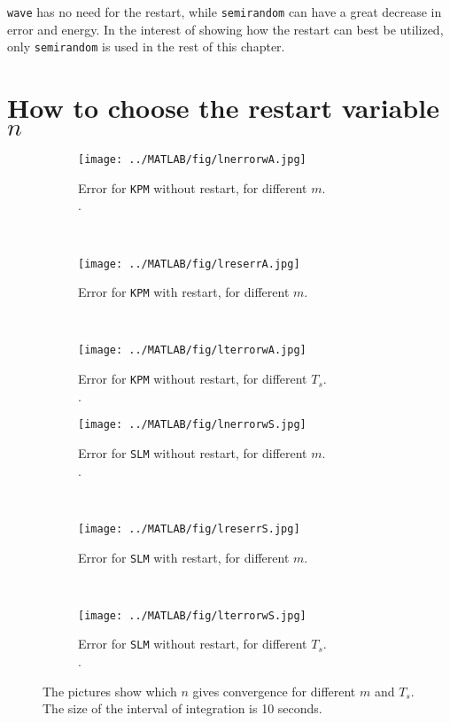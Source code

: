 \noindent \texttt{wave} has no need for the restart, while \texttt{semirandom} can have a great decrease in error and energy. In the interest of showing how the restart can best be utilized, only \texttt{semirandom} is used in the rest of this chapter.

\section{How to choose the restart variable $n$} \label{sec:resultatv}

\begin{figure}[H]
        \centering
        \begin{subfigure}[b]{0.30\textwidth}
                \texttt{[image: ../MATLAB/fig/lnerrorwA.jpg]}
                \caption{ Error for \texttt{KPM} without restart, for different $m$.\\. }
                \label{fig:lnerrorwA}
        \end{subfigure}
        ~
        \begin{subfigure}[b]{0.30\textwidth}
                \texttt{[image: ../MATLAB/fig/lreserrA.jpg]}
                \caption{ Error for \texttt{KPM} with restart, for different $m$.\\ }
                \label{fig:lreserrA}
        \end{subfigure}
        ~
        \begin{subfigure}[b]{0.30\textwidth}
                \texttt{[image: ../MATLAB/fig/lterrorwA.jpg]}
                \caption{ Error for \texttt{KPM} without restart, for different $T_s$.\\. }
                \label{fig:lterrorwA}
        \end{subfigure}

        
        \begin{subfigure}[b]{0.30\textwidth}
                \texttt{[image: ../MATLAB/fig/lnerrorwS.jpg]}
                \caption{ Error for \texttt{SLM} without restart, for different $m$.\\. }
                \label{fig:lnerrorwS}
        \end{subfigure}
		~
        \begin{subfigure}[b]{0.30\textwidth}
                \texttt{[image: ../MATLAB/fig/lreserrS.jpg]}
                \caption{ Error for \texttt{SLM} with restart, for different $m$.\\ }
                \label{fig:lreserrS}
        \end{subfigure}
        ~
        \begin{subfigure}[b]{0.30\textwidth}
                \texttt{[image: ../MATLAB/fig/lterrorwS.jpg]}
                \caption{ Error for \texttt{SLM} without restart, for different $T_s$.\\. }
                \label{fig:lterrorwS}
        \end{subfigure}
        
        
        \caption{ The pictures show which $n$ gives convergence for different $m$ and $T_s$. The size of the interval of integration is 10 seconds. }
        \label{fig:lerror}
\end{figure}
